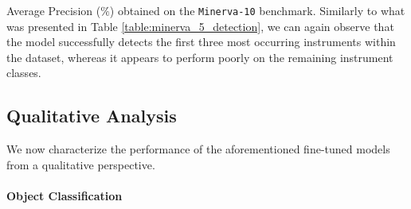 \begin{table}
	\caption{Average Precision ($\%$) obtained on the \texttt{Minerva-10} benchmark. Similarly to what was presented in Table \ref{table:minerva_5_detection}, we can again observe that the model successfully detects the first three most occurring instruments within the dataset, whereas it appears to perform poorly on the remaining instrument classes.}
\resizebox{\columnwidth}{!}{%
}
\label{table:minerva_10_detection}
\end{table}





\begin{figure}[htb!]
	\scalebox{0.8}{}
	\caption{}
	\label{fig:detection_experiment_2}
\end{figure}



\begin{figure}[htb!]
	\scalebox{0.8}{}
	\caption{}
	\label{fig:detection_experiment_3}
\end{figure}


\begin{figure}[htb!]
	\scalebox{0.8}{}
	\caption{}
	\label{fig:detection_experiment_4}
\end{figure}




\subsection{Qualitative Analysis}
\label{sec:qualitative_analysis}
We now characterize the performance of the aforementioned fine-tuned models from a qualitative perspective. 

\paragraph{Object Classification}


